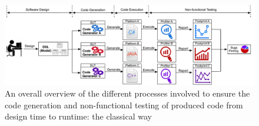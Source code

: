 \begin{figure}[t]
	\center
	
	\includegraphics[width=1.\linewidth]{chapitre4/fig/background.pdf}
	\caption{An overall overview of the different processes involved to ensure the code generation and non-functional testing of produced code from design time to runtime: the classical way}
	\label{fig:bbackground.pdf}
\end{figure}


